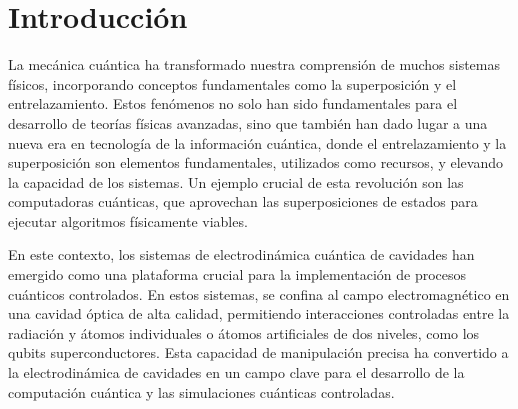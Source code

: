 \chapter{Introducción}
\label{ch:intro}

\pagestyle{fancy}
\fancyhf{}
\fancyhead[LE]{\nouppercase{\rightmark\hfill}}
\fancyhead[RO]{\nouppercase{\leftmark\hfill}}
\fancyfoot[LE,RO]{\hfill\thepage\hfill}

La mecánica cuántica ha transformado nuestra comprensión de muchos sistemas físicos, incorporando conceptos fundamentales como la superposición y el entrelazamiento. Estos fenómenos no solo han sido fundamentales para el desarrollo de teorías físicas avanzadas, sino que también han dado lugar a una nueva era en tecnología de la información cuántica, donde el entrelazamiento y la superposición son elementos fundamentales, utilizados como recursos, y elevando la capacidad de los sistemas. Un ejemplo crucial de esta revolución son las computadoras cuánticas, que aprovechan las superposiciones de estados para ejecutar algoritmos físicamente viables. 


En este contexto, los sistemas de electrodinámica cuántica de cavidades han emergido como una plataforma crucial para la implementación de procesos cuánticos controlados. En estos sistemas, se confina al campo electromagnético en una cavidad óptica de alta calidad, permitiendo interacciones controladas entre la radiación y átomos individuales o átomos artificiales de dos niveles, como los qubits superconductores. Esta capacidad de manipulación precisa ha convertido a la electrodinámica de cavidades en un campo clave para el desarrollo de la computación cuántica y las simulaciones cuánticas controladas. 

